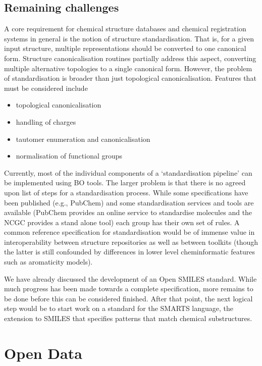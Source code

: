 \documentclass[10pt]{bmc_article}
\newenvironment{bmcformat}{\fussy\setboolean{publ}{true}}{\fussy}
\begin{document}
\begin{bmcformat}
\subsection*{Remaining challenges}

A core requirement for chemical structure databases and chemical
registration systems in general is the notion of structure
standardisation.  That is,  for a given input structure, multiple
representations should be converted to one canonical form.
Structure canonicalisation routines partially address this aspect,
converting multiple alternative topologies to a single canonical
form. However, the problem of standardisation is broader than just
topological canonicalisation. Features that must be considered include
\begin{itemize}
\item topological canonicalisation
\item handling of charges
\item tautomer enumeration and canonicalisation
\item normalisation of functional groups
\end{itemize}
Currently, most of the individual components of a `standardisation
pipeline' can be implemented using BO tools. The larger problem is
that there is no agreed upon list of steps for a standardisation
process. While some specifications have been published (e.g., PubChem)
and some standardisation services and tools are available (PubChem
provides an online service to standardise molecules and the NCGC
provides a stand alone tool) each group has their own set of rules. A
common reference specification for standardisation would be of immense
value in interoperability between structure repositories as well as
between toolkits (though the latter is still confounded by differences
in lower level cheminformatic features such as aromaticity models).

We have already discussed the development of an Open SMILES standard.
While much progress has been made towards a complete specification,
more remains to be done before this can be considered finished. After
that point, the next logical step would be to start work on a standard
for the SMARTS language, the extension to SMILES that specifies
patterns that match chemical substructures.

\section*{Open Data}


\end{bmcformat}
\end{document}
